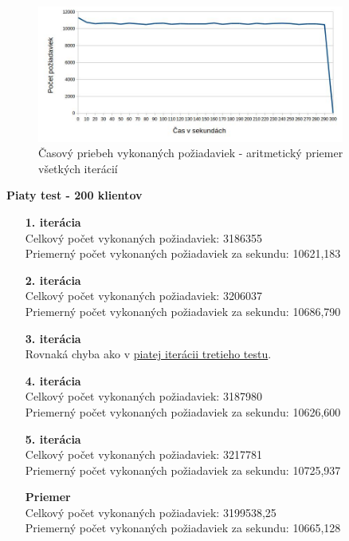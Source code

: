 \documentclass[12pt,oneside,final]{fithesis-utf8}
\begin{document}
\begin{itemize}
\begin{figure}[H]
  \centering
      \includegraphics[width=0.9\textwidth]{faban2_4_distr.jpg}
  \caption{Časový priebeh vykonaných požiadaviek - aritmetický priemer všetkých iterácií}
\end{figure}

\textbf{Piaty test - 200 klientov}
\begin{itemize}

\item[\textbf{1. iterácia}]\ \\
Celkový počet vykonaných požiadaviek: 3186355\\
Priemerný počet vykonaných požiadaviek za sekundu: 10621,183

\item[\textbf{2. iterácia}]\ \\
Celkový počet vykonaných požiadaviek: 3206037\\
Priemerný počet vykonaných požiadaviek za sekundu: 10686,790

\item[\textbf{3. iterácia}]\ \\
Rovnaká chyba ako v \hyperlink{label}{piatej iterácii tretieho testu}.

\item[\textbf{4. iterácia}]\ \\
Celkový počet vykonaných požiadaviek: 3187980\\
Priemerný počet vykonaných požiadaviek za sekundu: 10626,600

\item[\textbf{5. iterácia}]\ \\
Celkový počet vykonaných požiadaviek: 3217781\\
Priemerný počet vykonaných požiadaviek za sekundu: 10725,937

\item[\textbf{Priemer}]\ \\
Celkový počet vykonaných požiadaviek: 3199538,25\\
Priemerný počet vykonaných požiadaviek za sekundu: 10665,128


\end{itemize}
\end{itemize}
\end{document}
